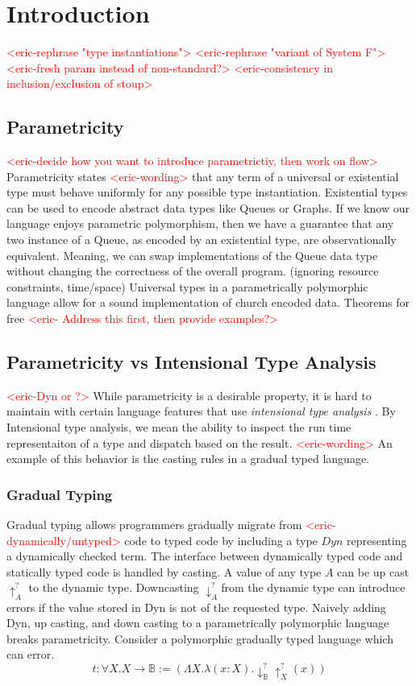 \documentclass[acmsmall]{acmart}
\newcommand{\eric}[1]{\textcolor{red}{ <eric-#1> }}
\begin{document}
\maketitle

\section{Introduction}
\eric{rephrase "type instantiations"}
\eric{rephrase "variant of System F"}
\eric{fresh param instead of non-standard?}
\eric{consistency in inclusion/exclusion of stoup}
\subsection{Parametricity}
\eric{decide how you want to introduce parametrictiy, then work on flow}
Parametricity states \eric{wording}that any term of a universal or existential type must behave uniformly for any possible type instantiation.
Existential types can be used to encode abstract data types like Queues or Graphs. 
If we know our language enjoys parametric polymorphism, then we have a guarantee that any two instance of a Queue, as encoded by an existential type, are observationally equivalent.
Meaning, we can swap implementations of the Queue data type without changing the correctness of the overall program. (ignoring resource constraints, time/space)
Universal types in a parametrically polymorphic language allow for a sound implementation of church encoded data. 
Theorems for free
	\eric{
	Address this first, then provide examples?}

\subsection{Parametricity vs Intensional Type Analysis}
\eric{Dyn or ?}
While parametricity is a desirable property, it is hard to maintain with certain language features that use \textit{intensional type analysis} \cite{IntTypeAnalysis}. By Intensional type analysis, we mean the ability to inspect the run time representaiton of a type and dispatch based on the result. \eric{wording}An example of this behavior is the casting rules in a gradual typed language\cite{GradParam}.


\subsubsection{Gradual Typing}
Gradual typing allows programmers gradually migrate from \eric{dynamically/untyped} code to typed code by including a type $Dyn$ representing a dynamically checked term. 
The interface between dynamically typed code and statically typed code is handled by casting.
A value of any type $A$ can be up cast $\uparrow_A^?$ to the dynamic type.
Downcasting $\downarrow_A^?$from the dynamic type can introduce errors if the value stored in Dyn is not of the requested type.
Naively adding Dyn, up casting, and down casting to a parametrically polymorphic language breaks parametricity. 
Consider a polymorphic gradually typed language which can error.
$$t : \forall X. X \rightarrow \mathbb{B}:= (\Lambda X. \lambda (x : X). \downarrow_\mathbb{B}^?\uparrow_X^?(x))$$
\end{document}
